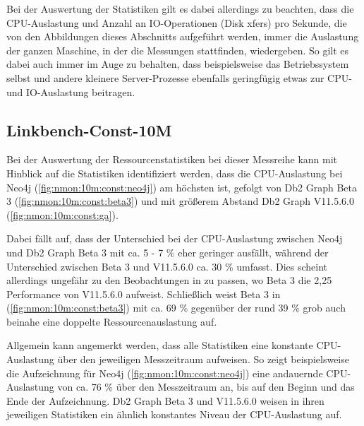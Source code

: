 Bei der Auswertung der Statistiken gilt es dabei allerdings zu beachten, dass die CPU-Auslastung und Anzahl an IO-Ope\-ra\-ti\-on\-en (Disk xfers) pro Sekunde, die von den Abbildungen dieses Abschnitts aufgeführt werden, immer die Auslastung der ganzen Maschine, in der die Messungen stattfinden, wiedergeben. So gilt es dabei auch immer im Auge zu behalten, dass beispielsweise das Betriebssystem selbst und andere kleinere Server-Prozesse ebenfalls geringfügig etwas zur CPU- und IO-Aus\-last\-ung beitragen.  

\subsection{Linkbench-Const-10M}
\label{auswertung:ressourcenauslastung:const}
Bei der Auswertung der Ressourcenstatistiken bei dieser Messreihe kann mit Hinblick auf die Statistiken identifiziert werden, dass die CPU-Auslastung bei Neo4j (\autoref{fig:nmon:10m:const:neo4j}) am höchsten ist, gefolgt von Db2 Graph Beta 3 (\autoref{fig:nmon:10m:const:beta3}) und mit größerem Abstand Db2 Graph V11.5.6.0 (\autoref{fig:nmon:10m:const:ga}). 

Dabei fällt auf, dass der Unterschied bei der CPU-Auslastung zwischen Neo4j und Db2 Graph Beta 3 mit ca. 5 - 7 \% eher geringer ausfällt, während der Unterschied zwischen Beta 3 und V11.5.6.0 ca. 30 \% umfasst. Dies scheint allerdings ungefähr zu den Beobachtungen in  zu passen, wo Beta 3 die 2,25 Performance von V11.5.6.0 aufweist. Schließlich weist Beta 3 in (\autoref{fig:nmon:10m:const:beta3}) mit ca. 69 \% gegenüber der rund 39 \% grob auch beinahe eine doppelte Ressourcenauslastung auf.

Allgemein kann angemerkt werden, dass alle Statistiken eine konstante CPU-Auslastung über den jeweiligen Messzeitraum aufweisen. So zeigt beispielsweise die Aufzeichnung für Neo4j (\autoref{fig:nmon:10m:const:neo4j}) eine andauernde CPU-Auslastung von ca. 76 \% über den Messzeitraum an, bis auf den Beginn und das Ende der Aufzeichnung. Db2 Graph Beta 3 und V11.5.6.0 weisen in ihren jeweiligen Statistiken ein ähnlich konstantes Niveau der CPU-Auslastung auf. 

